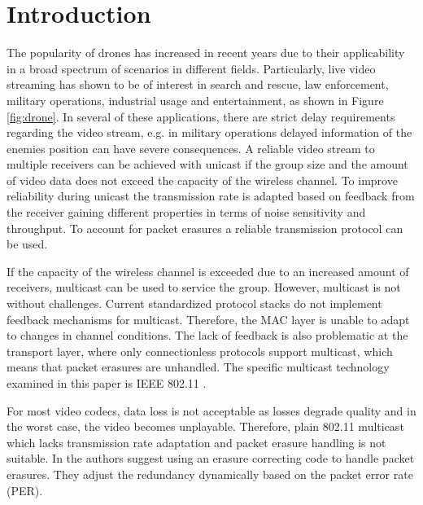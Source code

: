 \section{Introduction}\label{sec:introduction}
	The popularity of drones has increased in recent years due to their applicability in a broad spectrum of scenarios in different fields. Particularly, live video streaming has shown to be of interest in search and rescue, law enforcement, military operations, industrial usage and entertainment\cite{lockheed}, as shown in Figure \ref{fig:drone}.
	In several of these applications, there are strict delay requirements regarding the video stream, e.g. in military operations delayed information of the enemies position can have severe consequences.
	A reliable video stream to multiple receivers can be achieved with unicast if the group size and the amount of video data does not exceed the capacity of the wireless channel. To improve reliability during unicast the transmission rate is adapted based on feedback from the receiver gaining different properties in terms of noise sensitivity and throughput. To account for packet erasures a reliable transmission protocol can be used.

	If the capacity of the wireless channel is exceeded due to an increased amount of receivers, multicast can be used to service the group. However, multicast is not without challenges. Current standardized protocol stacks do not implement feedback mechanisms for multicast. Therefore, the MAC layer is unable to adapt to changes in channel conditions. %
The lack of feedback is also problematic at the transport layer, where only connectionless protocols support multicast, which means that packet erasures are unhandled. The specific multicast technology examined in this paper is IEEE 802.11 \cite{IEEE80211g}.

	For most video codecs, data loss is not acceptable as losses degrade quality and in the worst case, the video becomes unplayable. Therefore, plain 802.11 multicast which lacks transmission rate adaptation and packet erasure handling is not suitable. In \cite{nc_mult,vid_rate} the authors suggest using an erasure correcting code to handle packet erasures. They adjust the redundancy dynamically based on the packet error rate (PER). %
	


